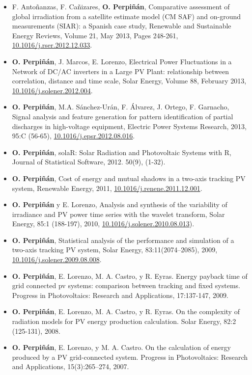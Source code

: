 \documentclass[article, a4paper]{memoir}
\begin{document}
\begin{itemize}
\item F. Antoñanzas, F. Cañizares, \textbf{O. Perpiñán}, Comparative assessment of global irradiation from a satellite estimate model (CM SAF) and on-ground measurements (SIAR): a Spanish case study, Renewable and Sustainable Energy Reviews, Volume 21, May 2013, Pages 248-261, \href{http://dx.doi.org/10.1016/j.rser.2012.12.033}{10.1016/j.rser.2012.12.033}.

\item \textbf{O. Perpiñán}, J. Marcos, E. Lorenzo, Electrical Power Fluctuations in a Network of DC/AC inverters in a Large PV Plant: relationship between correlation, distance and time scale, Solar Energy, Volume 88, February 2013, \href{http://dx.doi.org/10.1016/j.solener.2012.12.004}{10.1016/j.solener.2012.004}.

\item \textbf{O. Perpiñán}, M.A. Sánchez-Urán, F. Álvarez, J. Ortego, F. Garnacho, Signal analysis and feature generation for pattern identification of partial discharges in high-voltage equipment, Electric Power Systems Research, 2013, 95:C (56-65), \href{http://dx.doi.org/10.1016/j.epsr.2012.08.016}{10.1016/j.epsr.2012.08.016}.

\item \textbf{O. Perpiñán}, solaR: Solar Radiation and Photovoltaic Systems with R, Journal of Statistical Software, 2012. 50(9), (1-32).

\item \textbf{O. Perpiñán}, Cost of energy and mutual shadows in a two-axis tracking PV system, Renewable Energy, 2011, \href{http://dx.doi.org/10.1016/j.renene.2011.12.001}{10.1016/j.renene.2011.12.001}.

\item \textbf{O. Perpiñán} y E. Lorenzo, Analysis and synthesis of the variability of irradiance and PV power time series with the wavelet transform, Solar Energy, 85:1 (188-197), 2010, \href{http://dx.doi.org/10.1016/j.solener.2010.08.013}{10.1016/j.solener.2010.08.013}).

\item \textbf{O. Perpiñán}, Statistical analysis of the performance and simulation of a two-axis tracking PV system, Solar Energy, 83:11(2074–2085), 2009, \href{http://dx.doi.org/10.1016/j.solener.2009.08.008}{10.1016/j.solener.2009.08.008}.

\item \textbf{O. Perpiñán}, E. Lorenzo, M. A. Castro, y R. Eyras. Energy payback time of grid connected pv systems: comparison between tracking and fixed systems. Progress in Photovoltaics: Research and Applications, 17:137-147, 2009.

\item \textbf{O. Perpiñán}, E. Lorenzo, M. A. Castro, y R. Eyras. On the complexity of radiation models for PV energy production calculation. Solar Energy, 82:2 (125-131), 2008.

\item \textbf{O. Perpiñán}, E. Lorenzo, y M. A. Castro. On the calculation of energy produced by a PV grid-connected system. Progress in Photovoltaics: Research and Applications, 15(3):265–274, 2007.
\end{itemize}
\end{document}
